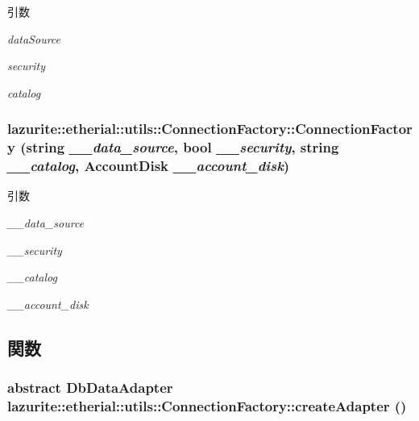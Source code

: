 \begin{DoxyParams}{引数}
\item[{\em dataSource}]\item[{\em security}]\item[{\em catalog}]\end{DoxyParams}
\hypertarget{classlazurite_1_1etherial_1_1utils_1_1_connection_factory_ac0e33b29a244b4c8342c6934fe508a81}{
\subsubsection[{ConnectionFactory}]{\setlength{\rightskip}{0pt plus 5cm}lazurite::etherial::utils::ConnectionFactory::ConnectionFactory (string {\em \_\-\_\-data\_\-source}, \/  bool {\em \_\-\_\-security}, \/  string {\em \_\-\_\-catalog}, \/  {\bf AccountDisk} {\em \_\-\_\-account\_\-disk})}}
\label{classlazurite_1_1etherial_1_1utils_1_1_connection_factory_ac0e33b29a244b4c8342c6934fe508a81}

\begin{DoxyParams}{引数}
\item[{\em \_\-\_\-data\_\-source}]\item[{\em \_\-\_\-security}]\item[{\em \_\-\_\-catalog}]\item[{\em \_\-\_\-account\_\-disk}]\end{DoxyParams}


\subsection{関数}
\hypertarget{classlazurite_1_1etherial_1_1utils_1_1_connection_factory_a5980a0a44f55a60cf4b991920d7f8529}{
\subsubsection[{createAdapter}]{\setlength{\rightskip}{0pt plus 5cm}abstract DbDataAdapter lazurite::etherial::utils::ConnectionFactory::createAdapter ()}}
\label{classlazurite_1_1etherial_1_1utils_1_1_connection_factory_a5980a0a44f55a60cf4b991920d7f8529}


